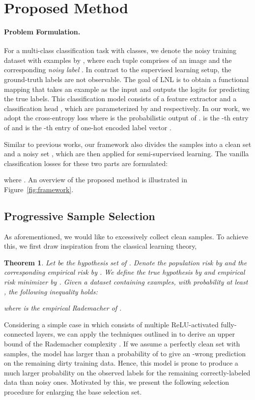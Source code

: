 \documentclass{article}
\newtheorem{theorem}{Theorem}
\begin{document}
\section{Proposed Method}
\paragraph{Problem Formulation.}
For a multi-class classification task with  classes, we denote the noisy training dataset with  examples by , where each tuple comprises of an image  and the corresponding \emph{noisy label}  . 
In contrast to the supervised learning setup, the ground-truth labels are not observable. 
The goal of LNL is to obtain a functional mapping  that takes an example  as the input and outputs the logits  for predicting the true labels. This classification model  consists of a feature extractor  and a classification head , which are parameterized by  and  respectively. In our work, we adopt the cross-entropy loss 
where  is the probabilistic output of .  is the -th entry of  and  is the -th entry of one-hot encoded label vector . 

Similar to previous works, our framework also divides the samples into a clean set  and a noisy set , which are then applied for semi-supervised learning. The vanilla classification losses for these two parts are formulated:

where . An overview of the proposed method is illustrated in Figure~\ref{fig:framework}.









\subsection{Progressive Sample Selection}
As aforementioned, we would like to excessively collect clean samples. To achieve this, we first draw inspiration from the classical learning theory,
\begin{theorem}\cite{DBLP:books/daglib/0033642}
Let  be the hypothesis set of . Denote the population risk by  and the corresponding empirical risk by . We define the true hypothesis by  and empirical risk minimizer by . Given a dataset containing  examples, with probability at least , the following inequality holds:

where  is the empirical Rademacher of .
\end{theorem}
Considering a simple case in which  consists of multiple ReLU-activated fully-connected layers, we can apply the techniques outlined in \cite{DBLP:conf/icml/Allen-ZhuLS19} to derive an upper bound of the Rademacher complexity . If we assume a perfectly clean set with  samples, the model has larger than a probability of  to give an -wrong prediction on the remaining dirty training data. Hence, this model is prone to produce a much larger probability on the observed labels for the remaining correctly-labeled data than noisy ones.
Motivated by this, we present the following selection procedure for enlarging the base selection set.
 
\end{document}
